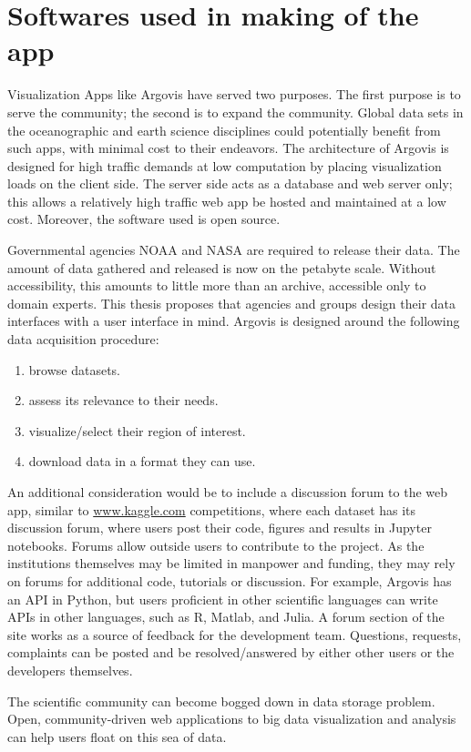 \section{Softwares used in making of the app}

Visualization Apps like Argovis have served two purposes. The first purpose is to serve the community; the second is to expand the community. Global data sets in the oceanographic and earth science disciplines could potentially benefit from such apps, with minimal cost to their endeavors. The architecture of Argovis is designed for high traffic demands at low computation by placing visualization loads on the client side. The server side acts as a database and web server only; this allows a relatively high traffic web app be hosted and maintained at a low cost. Moreover, the software used is open source. 

Governmental agencies NOAA and NASA are required to release their data. The amount of data gathered and released is now on the petabyte scale. Without accessibility, this amounts to little more than an archive, accessible only to domain experts. This thesis proposes that agencies and groups design their data interfaces with a user interface in mind. Argovis is designed around the following data acquisition procedure: 
\begin{enumerate}
  \item browse datasets. 
  \item assess its relevance to their needs.
  \item visualize/select their region of interest.
  \item download data in a format they can use.
\end{enumerate}
An additional consideration would be to include a discussion forum to the web app, similar to \url{www.kaggle.com} \cite{kaggle} competitions, where each dataset has its discussion forum, where users post their code, figures and results in \gls{Jupyter} notebooks. Forums allow outside users to contribute to the project. As the institutions themselves may be limited in manpower and funding, they may rely on forums for additional code, tutorials or discussion. For example, Argovis has an API in Python, but users proficient in other scientific languages can write APIs in other languages, such as R, Matlab, and Julia. A forum section of the site works as a source of feedback for the development team. Questions, requests, complaints can be posted and be resolved/answered by either other users or the developers themselves.

The scientific community can become bogged down in data storage problem. Open, community-driven web applications to big data visualization and analysis can help users float on this sea of data.